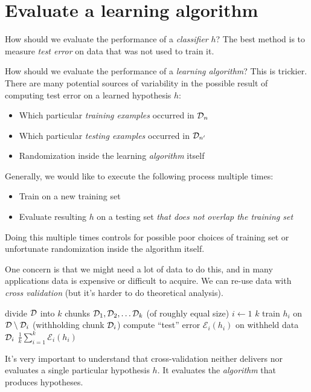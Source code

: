 \documentclass[11pt]{article}
\newcommand\data{{\cal D}}
\newcommand\dataTrain{{\cal D}_n}
\newcommand\dataTest{{\cal D}_{n'}}
\newcommand{\qn}[1]{\textcolor{orange}{Quynh: #1}}
\begin{document}



\section{Evaluate a learning algorithm}

How should we evaluate the performance of a {\em classifier} $h$?   The best
method is to measure {\em test error} on data that was not used to
train it. 

How should we evaluate the performance of a {\em learning algorithm}?
This is trickier.  There are many potential sources of variability in
the possible result of computing test error on a learned hypothesis $h$:
\begin{itemize}
\item Which particular {\em training examples} occurred in $\dataTrain$
\item Which particular {\em testing examples} occurred in $\dataTest$
\item Randomization inside the learning {\em algorithm} itself
\end{itemize}
Generally, we would like to execute the following process multiple
times: 
\begin{itemize}
\item Train on a new training set
\item Evaluate resulting $h$ on a testing set {\em that does not
    overlap the training set}
\end{itemize}
Doing this multiple times controls for possible poor choices of
training set or unfortunate randomization inside the algorithm itself.

One concern is that we might need a lot of data to do this, and in
many applications data is expensive or difficult to acquire. We can 
re-use data with {\em{cross validation}} (but it's harder to do theoretical
analysis).  \\
\begin{codebox}
  \Procname{$\proc{Cross-Validate}(\data, k)$}
  \li divide $\data$ into $k$ chunks $\data_1, \data_2, \ldots \data_k$ (of roughly equal size)
  \li \For $i \gets 1$ \To $k$
  \li   \Do
          train $h_i$ on $\data \setminus \data_i$ (withholding chunk $\data_i$)
  \li     compute ``test'' error $\mathcal{E}_i (h_i)$ on withheld data $\data_i$
        \End
  \li \Return $\frac{1}{k} \sum_{i=1}^k \mathcal{E}_i (h_i)$
\end{codebox}

It's very important to understand that cross-validation neither
delivers nor evaluates a single particular hypothesis $h$.  It
evaluates the {\em algorithm} that produces hypotheses.
\end{document}
